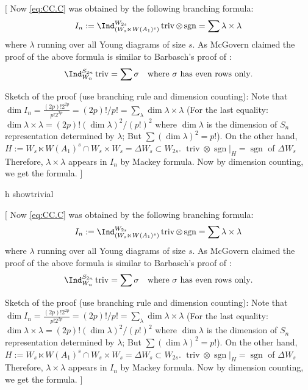 \documentclass[12pt,a4paper]{amsart}
\newcommand{\trivial}[2][]{\if\relax\detokenize{#1}\relax
  {%
      \color{orange} \vspace{0em} $[$  #2 $]$
      \color{black}
  }
  \else
\ifx#1h
\ifcsname showtrivial\endcsname
{%
    \color{orange} \vspace{0em}  $[$ #2 $]$
    \color{black}
}
\fi
\else {\red Wrong argument!} \fi
\fi
}
\newcommand{\sgn}{\operatorname{sgn}}
\newcommand{\triv}{\operatorname{triv}}
\numberwithin{equation}{section}
\theoremstyle{remark}
\begin{document}
\trivial{ %
  Now \eqref{eq:CC.C} was obtained by the following branching formula:
  \cite[p220 (6)]{Mc}
  \[
    I_n:= \Ind_{(W_s\ltimes W(A_1)^s)}^{W_{2s}}\triv\otimes \sgn = \sum \lambda\times \lambda
  \]
  where $\lambda$ running over all Young diagrams of size $s$. As McGovern
  claimed the proof of the above formula is similar to Barbasch's proof of
  \cite[Lemma~4.1]{BV.W}:
  \[
    \Ind_{W_n}^{S_{2n}} \triv = \sum \sigma \quad \text{where $\sigma$ has even
      rows only}.
  \]

  Sketch of the proof (use branching rule and dimension counting): Note that
  $\dim I_n = \frac{(2p)! 2^{2p}}{p! 2^{2p}} = (2p)!/p! =\sum_\lambda \dim \lambda\times \lambda$
  (For the last equality:
  $\dim \lambda\times \lambda = (2p)! (\dim \lambda)^2/(p!)^2$ where
  $\dim \lambda$ is the dimension of $S_n$ representation determined by
  $\lambda$; But $\sum (\dim \lambda)^2 = p!$). On the other hand,
  $H :=W_s\ltimes W(A_1)^s\cap W_s\times W_s = \Delta W_s \subset W_{2s}$.
  $\triv \otimes \sgn|_H = \sgn$ of $\Delta W_s$ Therefore,
  $\lambda\times \lambda$ appears in $I_n$ by Mackey formula. Now by dimension
  counting, we get the formula. }

\medskip
\end{document}
